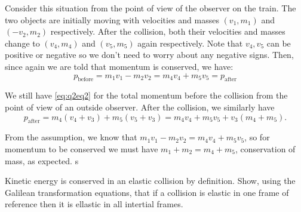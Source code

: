 \begin{solution}
  Consider this situation from the point of view of the observer on the train. The two objects are initially moving with velocities and masses $(v_1, m_1)$ and $(-v_2, m_2)$ respectively. After the collision, both their velocities and masses change to $(v_4, m_4)$ and $(v_5, m_5)$ again respectively. Note that $v_4, v_5$ can be positive or negative so we don't need to worry about any negative signs. Then, since again we are told that momentum is conserved, we have:
  \begin{equation}
    p_{\text{before}} = m_1 v_1 - m_2 v_2 = m_4 v_4 + m_5 v_5 = p_{\text{after}}
  \end{equation}

  We still have \eqref{eq:q2eq2} for the total momentum before the collision from the point of view of an outside observer. After the collision, we similarly have
  \begin{equation}
    p_{\text{after}} = m_4 ( v_4 + v_3 ) + m_5 ( v_5 + v_3 ) = m_4 v_4 + m_5 v_5 + v_3 (m_4 + m_5).
  \end{equation}

  From the assumption, we know that $m_1 v_1 - m_2 v_2 = m_4 v_4 + m_5 v_5$, so for momentum to be conserved we must have $m_1 + m_2 = m_4 + m_5$, conservation of mass, as expected. s
\end{solution}


\begin{question}
  Kinetic energy is conserved in an elastic collision by definition. Show, using the Galilean transformation equations, that if a collision is elastic in one frame of reference then it is ellastic in all intertial frames.
\end{question}
